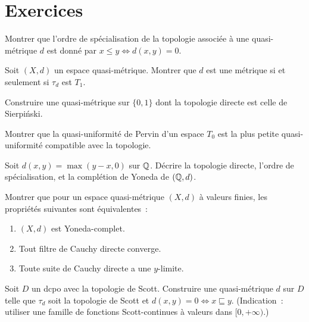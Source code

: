 \section{Exercices}

\begin{exercice}
Montrer que l'ordre de sp\'ecialisation de la topologie associ\'ee \`a une quasi-m\'etrique
$d$ est donn\'e par $x \leq y \Leftrightarrow d(x,y) = 0$.
\end{exercice}

\begin{exercice}
Soit $(X,d)$ un espace quasi-m\'etrique. Montrer que $d$ est une m\'etrique si et
seulement si $\tau_d$ est $T_1$.
\end{exercice}

\begin{exercice}
Construire une quasi-m\'etrique sur $\{0,1\}$ dont la topologie directe est celle de
Sierpi\'nski.
\end{exercice}

\begin{exercice}
Montrer que la quasi-uniformit\'e de Pervin d'un espace $T_0$ est la plus petite
quasi-uniformit\'e compatible avec la topologie.
\end{exercice}

\begin{exercice}
Soit $d(x,y) = \max(y-x, 0)$ sur $\mathbb{Q}$. D\'ecrire la topologie directe, l'ordre de
sp\'ecialisation, et la compl\'etion de Yoneda de $(\mathbb{Q}, d)$.
\end{exercice}

\begin{exercice}
Montrer que pour un espace quasi-m\'etrique $(X,d)$ \`a valeurs finies, les propri\'et\'es
suivantes sont \'equivalentes~:
\begin{enumerate}
  \item $(X,d)$ est Yoneda-complet.
  \item Tout filtre de Cauchy directe converge.
  \item Toute suite de Cauchy directe a une $y$-limite.
\end{enumerate}
\end{exercice}

\begin{exercice}
Soit $D$ un dcpo avec la topologie de Scott. Construire une quasi-m\'etrique $d$ sur $D$
telle que $\tau_d$ soit la topologie de Scott et $d(x,y) = 0 \Leftrightarrow x \sqsubseteq y$.
(Indication~: utiliser une famille de fonctions Scott-continues \`a valeurs dans
$[0,+\infty)$.)
\end{exercice}
